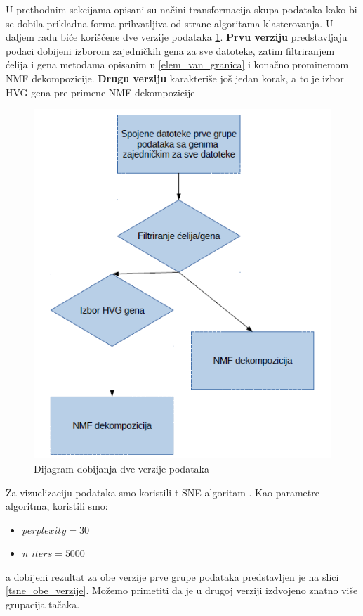\documentclass[a4paper]{article}
\begin{document}
U prethodnim sekcijama opisani su načini transformacija skupa podataka kako bi se dobila prikladna forma prihvatljiva od strane algoritama klasterovanja. U daljem radu biće korišćene dve verzije podataka \ref{plan}. \textbf{Prvu verziju} predstavljaju podaci dobijeni izborom zajedničkih gena za sve datoteke, zatim filtriranjem ćelija i gena metodama opisanim u \ref{elem_van_granica} i konačno prominemom NMF dekompozicije. \textbf{Drugu verziju} karakteriše još jedan korak, a to je izbor HVG gena pre primene NMF dekompozicije


\begin{figure}[h!]
\centering
\includegraphics[scale=0.7]{plan}
\caption{Dijagram dobijanja dve verzije podataka}
\label{plan}
\end{figure}


Za vizuelizaciju podataka smo koristili t-SNE algoritam \cite{maaten2008visualizing}. Kao parametre algoritma, koristili smo:
\begin{itemize}
\item $perplexity =30$
\item $n\_iters = 5000$
\end{itemize}

a dobijeni rezultat za obe verzije prve grupe podataka predstavljen je na slici \ref{tsne_obe_verzije}. Možemo primetiti da je u drugoj verziji izdvojeno znatno više grupacija tačaka.
\end{document}
